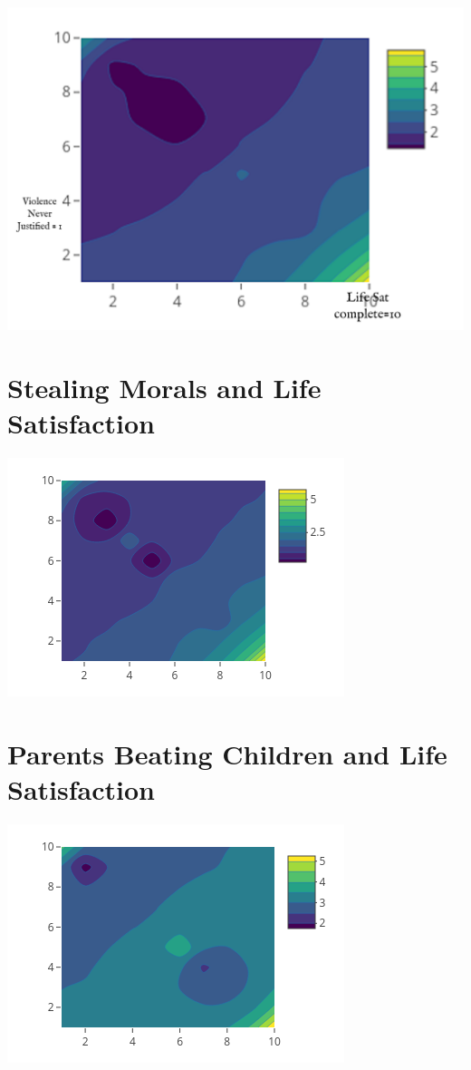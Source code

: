 \documentclass{amsart}
\begin{document}
\includegraphics[scale=0.15]{violence_lifesat2.png}

\section{Stealing Morals and Life Satisfaction}

\includegraphics[scale=01.0]{stealing_lifesat.png}

\section{Parents Beating Children and Life Satisfaction}

\includegraphics[scale=1.0]{beatchild_lifesat.png}
\end{document}
